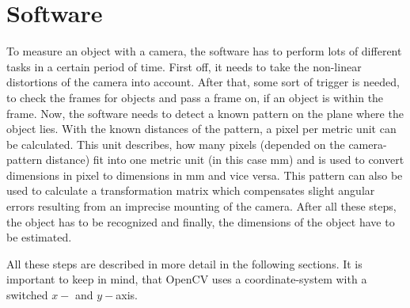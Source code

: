 \section{Software}
To measure an object with a camera, the software has to perform lots of different tasks in a certain period of time.
First off, it needs to take the non-linear distortions of the camera into account.
After that, some sort of trigger is needed, to check the frames for objects and pass a frame on, if an object is within the frame.
Now, the software needs to detect a known pattern on the plane where the object lies.
With the known distances of the pattern, a pixel per metric unit can be calculated.
This unit describes, how many pixels (depended on the camera-pattern distance) fit into one metric unit (in this case mm) and is used to convert dimensions in pixel to dimensions in mm and vice versa.
This pattern can also be used to calculate a transformation matrix which compensates slight angular errors resulting from an imprecise mounting of the camera.
After all these steps, the object has to be recognized and
finally, the dimensions of the object have to be estimated.

All these steps are described in more detail in the following sections.
It is important to keep in mind, that OpenCV uses a coordinate-system with a switched $x-$ and $y-$axis. 


\lstset{style=mystyle}

